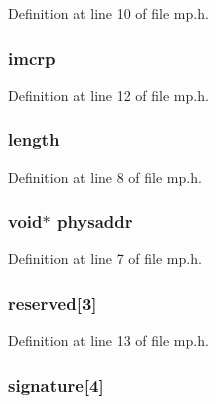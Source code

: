 Definition at line 10 of file mp.\-h.

\hypertarget{structmp_aaf1948d64f988c62ec336c0f5671f7ee}{
\subsubsection[{imcrp}]{ imcrp}}\label{structmp_aaf1948d64f988c62ec336c0f5671f7ee}


Definition at line 12 of file mp.\-h.

\hypertarget{structmp_a180b846dc61a2dd05de3a1d6da4f3c44}{
\subsubsection[{length}]{ length}}\label{structmp_a180b846dc61a2dd05de3a1d6da4f3c44}


Definition at line 8 of file mp.\-h.

\hypertarget{structmp_a296f4b12bd3434a24b7f500e03c349e6}{
\subsubsection[{physaddr}]{\setlength{\rightskip}{0pt plus 5cm}void$\ast$ physaddr}}\label{structmp_a296f4b12bd3434a24b7f500e03c349e6}


Definition at line 7 of file mp.\-h.

\hypertarget{structmp_a53d99441ce014bd1cb1903e40a497d90}{
\subsubsection[{reserved}]{ reserved\mbox{[}3\mbox{]}}}\label{structmp_a53d99441ce014bd1cb1903e40a497d90}


Definition at line 13 of file mp.\-h.

\hypertarget{structmp_a086ff3269e8b74e0f05b9120d4cac23b}{
\subsubsection[{signature}]{ signature\mbox{[}4\mbox{]}}}\label{structmp_a086ff3269e8b74e0f05b9120d4cac23b}


